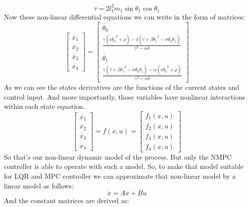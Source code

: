 \begin{equation}\tau = 2l^2_1m_1\sin\theta_1\cos\theta_1\end{equation}
Now these non-linear differential equations we can write in the form of matrices:
\begin{equation}\label{nonlinmodel}
\begin{bmatrix}
\dot{x_1} \\ \dot{x_2} \\ \dot{x_3} \\ \dot{x_4}
\end{bmatrix} = \begin{bmatrix}
\dot{\theta_0}\\
\frac{\gamma(\epsilon\dot{\theta_0}^2+\rho)-\delta(\tau+\beta\dot{\theta_1}^2-\sigma\dot{\theta_0}\dot{\theta_1})}{\gamma^2-\alpha\delta}\\
\dot{\theta_1}\\
 \frac{\gamma(\tau+\beta\dot{\theta_1}^2-\sigma\dot{\theta_0}\dot{\theta_1})-\alpha(\epsilon\dot{\theta_0}^2+\rho)}{\gamma^2-\alpha\delta}
\end{bmatrix}
\end{equation}
As we can see the states derivatives are the functions of the current states and control input. And more importantly, those variables have nonlinear interactions within each state equation. 
\begin{equation}\begin{bmatrix}
\dot{x_1} \\ \dot{x_2} \\ \dot{x_3} \\ \dot{x_4}
\end{bmatrix} = f(x,u) =\begin{bmatrix}f_1(x,u)\\f_2(x,u)\\f_3(x,u)\\f_4(x,u)\end{bmatrix} \end{equation}
So that’s our non-linear dynamic model of the process. But only the NMPC controller is able to operate with such a model.  So, to make that model suitable for LQR and MPC controller we can approximate that non-linear model by a linear model as follows:
\begin{equation}\dot{x} = Ax + Bu\end{equation}
And the constant matrices are derived as:
